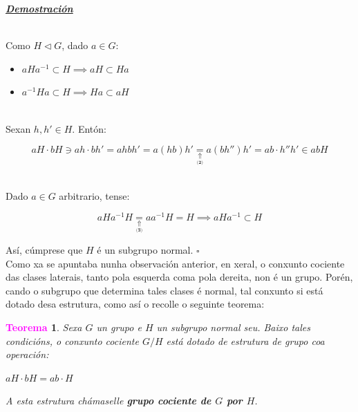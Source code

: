 \documentclass[twoside]{report}
\newcommand{\magbf}[1]{\textcolor{magenta}{\textbf{#1}}} %
\theoremstyle{mystyle}
\newtheorem{theo}{\magbf{Teorema}}[chapter]
\newenvironment{theorem}
{\begin{mdframed}[linecolor = magenta,backgroundcolor = classicrose, linewidth = 2mm]\begin{theo}}
{\end{theo}\end{mdframed}}
\begin{document}
\vspace{2mm}

\noindent \textbf{\textit{\underline{Demostración}}}

\vspace{2mm}

\noindent {}\\

\noindent Como $H \triangleleft G$, dado $a \in G$:

\begin{itemize}
    \item $aHa^{-1} \subset H \implies aH \subset Ha$
    \item $a^{-1}Ha \subset H \implies Ha \subset aH$
\end{itemize}

\noindent {} \\

\noindent Sexan $h, h' \in H$. Entón: 

$$aH \cdot bH \ni ah \cdot bh' = ahbh'= a(hb)h' \underset{\underset{\textbf{(2)}}{\Uparrow}}{=} a(bh'')h' = ab \cdot h''h' \in abH $$

\noindent {} \\

\noindent Dado $a \in G$ arbitrario, tense: 

$$aHa^{-1}H \underset{\underset{\textbf{(3)}}{\Uparrow}}{=} aa^{-1}H = H \implies aHa^{-1} \subset H$$ 

\noindent Así, cúmprese que $H$ é un subgrupo normal. $\square$ \\

\noindent Como xa se apuntaba nunha observación anterior, en xeral, o conxunto cociente das clases laterais, tanto pola esquerda coma pola dereita, non é un grupo. Porén, cando o subgrupo que determina tales clases é normal, tal conxunto si está dotado desa estrutura, como así o recolle o seguinte teorema: \\

\begin{theorem}
Sexa $G$ un grupo e $H$ un subgrupo normal seu. Baixo tales condicións, o conxunto cociente $G/H$ está dotado de estrutura de grupo coa operación:
\begin{center}
    $aH \cdot bH = ab \cdot H$
\end{center}
A esta estrutura chámaselle \textbf{grupo cociente de $G$ por $H$}.
\end{theorem}
\end{document}
